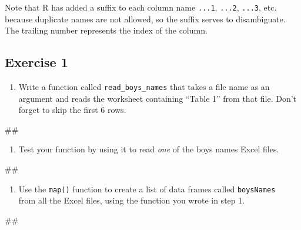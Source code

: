 \documentclass[]{book}
\newenvironment{Shaded}{\begin{snugshade}}{\end{snugshade}}
\newcommand{\NormalTok}[1]{#1}
\providecommand{\tightlist}{%
  \setlength{\itemsep}{0pt}\setlength{\parskip}{0pt}}
\begin{document}
Note that R has added a suffix to each column name \texttt{...1},
\texttt{...2}, \texttt{...3}, etc. because duplicate names are not
allowed, so the suffix serves to disambiguate. The trailing number
represents the index of the column.

\subsection{Exercise 1}\label{exercise-1-3}

\begin{enumerate}
\def\labelenumi{\arabic{enumi}.}
\tightlist
\item
  Write a function called \texttt{read\_boys\_names} that takes a file
  name as an argument and reads the worksheet containing ``Table 1''
  from that file. Don't forget to skip the first 6 rows.
\end{enumerate}

\begin{Shaded}
\begin{Highlighting}[]
\NormalTok{## }
\end{Highlighting}
\end{Shaded}

\begin{enumerate}
\def\labelenumi{\arabic{enumi}.}
\setcounter{enumi}{1}
\tightlist
\item
  Test your function by using it to read \emph{one} of the boys names
  Excel files.
\end{enumerate}

\begin{Shaded}
\begin{Highlighting}[]
\NormalTok{## }
\end{Highlighting}
\end{Shaded}

\begin{enumerate}
\def\labelenumi{\arabic{enumi}.}
\setcounter{enumi}{2}
\tightlist
\item
  Use the \texttt{map()} function to create a list of data frames called
  \texttt{boysNames}\\
  from all the Excel files, using the function you wrote in step 1.
\end{enumerate}

\begin{Shaded}
\begin{Highlighting}[]
\NormalTok{## }
\end{Highlighting}
\end{Shaded}
\end{document}
